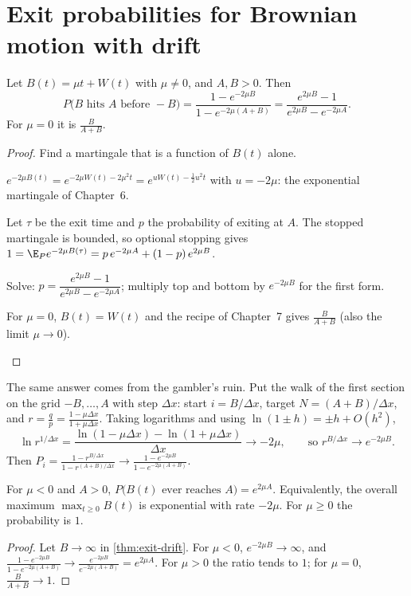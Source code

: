 \section{Exit probabilities for Brownian motion with drift}

\begin{theorem}
\label{thm:exit-drift}
Let $B(t)=\mu t+W(t)$ with $\mu\ne0$, and $A,B>0$. Then
\[
  P\big(B\text{ hits }A\text{ before }-B\big)=\frac{1-e^{-2\mu B}}{1-e^{-2\mu(A+B)}}=\frac{e^{2\mu B}-1}{e^{2\mu B}-e^{-2\mu A}} .
\]
For $\mu=0$ it is $\frac{B}{A+B}$.
\end{theorem}
\begin{proof}
Find a martingale that is a function of $B(t)$ alone.
\begin{steps}
  \item $e^{-2\mu B(t)}=e^{-2\mu W(t)-2\mu^2t}=e^{uW(t)-\frac12u^2t}$ with $u=-2\mu$: the exponential martingale of Chapter~6.
  \item Let $\tau$ be the exit time and $p$ the probability of exiting at $A$. The stopped martingale is bounded, so optional stopping gives $1=\E_Pe^{-2\mu B(\tau)}=p\,e^{-2\mu A}+(1-p)\,e^{2\mu B}$.
  \item Solve: $p=\dfrac{e^{2\mu B}-1}{e^{2\mu B}-e^{-2\mu A}}$; multiply top and bottom by $e^{-2\mu B}$ for the first form.
  \item For $\mu=0$, $B(t)=W(t)$ and the recipe of Chapter~7 gives $\frac{B}{A+B}$ (also the limit $\mu\to0$). \qedhere
\end{steps}
\end{proof}

\begin{remark}
The same answer comes from the gambler's ruin. Put the walk of the first section on the grid $-B,\dots,A$ with step $\Delta x$: start $i=B/\Delta x$, target $N=(A+B)/\Delta x$, and $r=\frac qp=\frac{1-\mu\Delta x}{1+\mu\Delta x}$. Taking logarithms and using $\ln(1\pm h)=\pm h+O(h^2)$,
\[
  \ln r^{1/\Delta x}=\frac{\ln(1-\mu\Delta x)-\ln(1+\mu\Delta x)}{\Delta x}\to-2\mu,\qquad\text{so } r^{B/\Delta x}\to e^{-2\mu B}.
\]
Then $P_i=\frac{1-r^{B/\Delta x}}{1-r^{(A+B)/\Delta x}}\to\frac{1-e^{-2\mu B}}{1-e^{-2\mu(A+B)}}$.
\end{remark}

\begin{result}
\label{res:ever}
For $\mu<0$ and $A>0$, $P\big(B(t)\text{ ever reaches }A\big)=e^{2\mu A}$. Equivalently, the overall maximum $\max_{t\ge0}B(t)$ is exponential with rate $-2\mu$. For $\mu\ge0$ the probability is $1$.
\end{result}
\begin{proof}
Let $B\to\infty$ in \cref{thm:exit-drift}. For $\mu<0$, $e^{-2\mu B}\to\infty$, and $\frac{1-e^{-2\mu B}}{1-e^{-2\mu(A+B)}}\to\frac{e^{-2\mu B}}{e^{-2\mu(A+B)}}=e^{2\mu A}$. For $\mu>0$ the ratio tends to $1$; for $\mu=0$, $\frac{B}{A+B}\to1$.
\end{proof}

